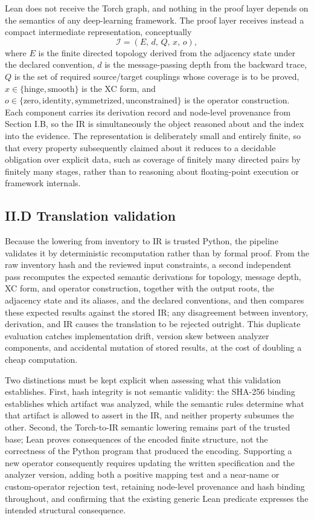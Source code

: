Lean does not receive the Torch graph, and nothing in the proof layer depends on the semantics of any deep-learning framework. The proof layer receives instead a compact intermediate representation, conceptually
\[
\mathcal{I} = (E,\, d,\, Q,\, x,\, o),
\]
where $E$ is the finite directed topology derived from the adjacency state under the declared convention, $d$ is the message-passing depth from the backward trace, $Q$ is the set of required source/target couplings whose coverage is to be proved, $x \in \{\text{hinge}, \text{smooth}\}$ is the XC form, and $o \in \{\text{zero}, \text{identity}, \text{symmetrized}, \text{unconstrained}\}$ is the operator construction. Each component carries its derivation record and node-level provenance from Section I.B, so the IR is simultaneously the object reasoned about and the index into the evidence. The representation is deliberately small and entirely finite, so that every property subsequently claimed about it reduces to a decidable obligation over explicit data, such as coverage of finitely many directed pairs by finitely many stages, rather than to reasoning about floating-point execution or framework internals.

\subsection*{II.D Translation validation}

Because the lowering from inventory to IR is trusted Python, the pipeline validates it by deterministic recomputation rather than by formal proof. From the raw inventory hash and the reviewed input constraints, a second independent pass recomputes the expected semantic derivations for topology, message depth, XC form, and operator construction, together with the output roots, the adjacency state and its aliases, and the declared conventions, and then compares these expected results against the stored IR; any disagreement between inventory, derivation, and IR causes the translation to be rejected outright. This duplicate evaluation catches implementation drift, version skew between analyzer components, and accidental mutation of stored results, at the cost of doubling a cheap computation.

Two distinctions must be kept explicit when assessing what this validation establishes. First, hash integrity is not semantic validity: the SHA-256 binding establishes which artifact was analyzed, while the semantic rules determine what that artifact is allowed to assert in the IR, and neither property subsumes the other. Second, the Torch-to-IR semantic lowering remains part of the trusted base; Lean proves consequences of the encoded finite structure, not the correctness of the Python program that produced the encoding. Supporting a new operator consequently requires updating the written specification and the analyzer version, adding both a positive mapping test and a near-name or custom-operator rejection test, retaining node-level provenance and hash binding throughout, and confirming that the existing generic Lean predicate expresses the intended structural consequence.

